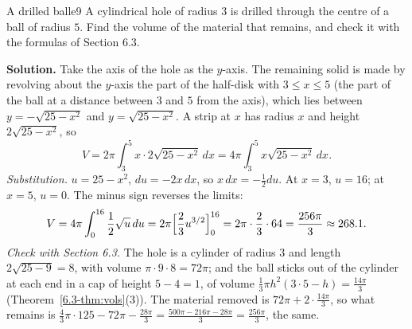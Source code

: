 \documentclass[11pt]{article}
\begin{document}
\begin{exmp}{A drilled ball}{e9}
A cylindrical hole of radius $3$ is drilled through the centre of a ball of radius $5$. Find the volume of the material that remains, and check it with the formulas of Section 6.3.

\textbf{Solution.} Take the axis of the hole as the $y$-axis. The remaining solid is made by revolving about the $y$-axis the part of the half-disk with $3\le x\le5$ (the part of the ball at a distance between $3$ and $5$ from the axis), which lies between $y=-\sqrt{25-x^2}$ and $y=\sqrt{25-x^2}$. A strip at $x$ has radius $x$ and height $2\sqrt{25-x^2}$, so
\[
V=2\pi\int_3^5x\cdot2\sqrt{25-x^2}\,dx=4\pi\int_3^5x\sqrt{25-x^2}\,dx .
\]
\emph{Substitution.} $u=25-x^2$, $du=-2x\,dx$, so $x\,dx=-\frac12du$. At $x=3$, $u=16$; at $x=5$, $u=0$. The minus sign reverses the limits:
\[
V=4\pi\int_0^{16}\frac12\sqrt u\,du=2\pi\Bigl[\frac23u^{3/2}\Bigr]_0^{16}=2\pi\cdot\frac23\cdot64=\frac{256\pi}3\approx268.1 .
\]
\emph{Check with Section 6.3.} The hole is a cylinder of radius $3$ and length $2\sqrt{25-9}=8$, with volume $\pi\cdot9\cdot8=72\pi$; and the ball sticks out of the cylinder at each end in a cap of height $5-4=1$, of volume $\frac13\pi h^2(3\cdot5-h)=\frac{14\pi}3$ (Theorem~\ref{6.3-thm:vols}(3)). The material removed is $72\pi+2\cdot\frac{14\pi}3$, so what remains is $\frac43\pi\cdot125-72\pi-\frac{28\pi}3=\frac{500\pi-216\pi-28\pi}3=\frac{256\pi}3$, the same.


\end{exmp}
\end{document}
